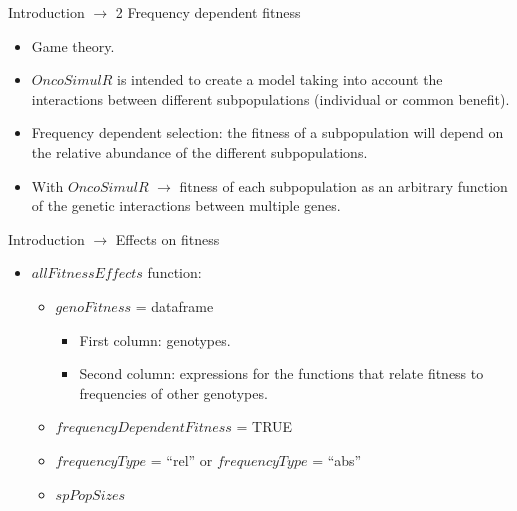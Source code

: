 \begin{frame}{Introduction $\rightarrow$ 2 Frequency dependent fitness}

    \begin{itemize}    
        \item Game theory.
        \item $OncoSimulR$ is intended to create a model taking into account the interactions between different subpopulations (individual or common benefit).
        \item Frequency dependent selection: the fitness of a subpopulation will depend on the relative abundance of the different subpopulations.
        \item With $OncoSimulR$ $\rightarrow$ fitness of each subpopulation as an arbitrary function of the genetic interactions between multiple genes.       
    \end{itemize}
    
\end{frame}

\begin{frame}{Introduction $\rightarrow$ Effects on fitness}

    \begin{itemize}
        \item $allFitnessEffects$ function:
        \begin{itemize}
            \item $genoFitness$ = dataframe
            \begin{itemize}
                \item First column: genotypes.
                \item Second column: expressions for the functions that relate fitness to frequencies of other genotypes.
            \end{itemize}
            \item $frequencyDependentFitness$ = TRUE
            \item $frequencyType$ = “rel” or $frequencyType$ = “abs”
            \item $spPopSizes$
        \end{itemize}        
    \end{itemize}

\end{frame}

